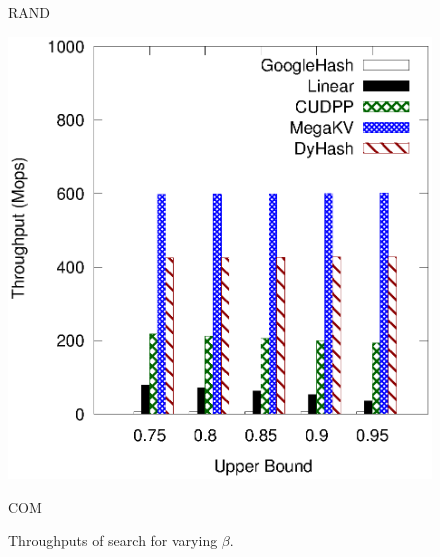 \begin{figure}[h]
\begin{minipage}{0.19\linewidth}
		\centerline{RAND}
	\end{minipage}
	\hfill
	\begin{minipage}{0.19\linewidth}\centering
		\includegraphics[width=\linewidth]{pic/static-upper/upper_search_ali.eps}
		\centerline{COM}
	\end{minipage}
	\caption{Throughputs of search for varying $\beta$.}
	\label{fig:static:all:search}
\end{figure}

